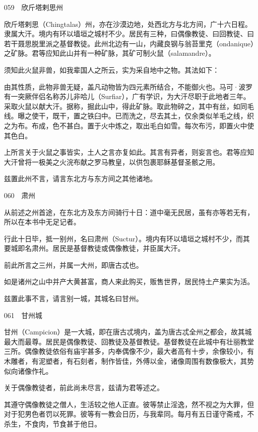 \documentclass[12pt,UTF8]{ctexbook}
\begin{document}
059　欣斤塔剌思州

欣斤塔剌思（Chingtalas）州，亦在沙漠边地，处西北方与北方间，广十六日程。隶属大汗。境内有环以墙垣之城村不少。居民有三种，曰偶像教徒、曰回教徒、曰若干聂思脱里派之基督教徒。此州北边有一山，内藏良钢与翁苔里克（ondanique）之矿脉。君等应知此山并有一种矿脉，其矿可制火鼠（salamandre）。

须知此火鼠非兽，如我辈国人之所云，实为采自地中之物。其法如下：

由其性质，此物非兽无疑，盖凡动物皆为四元素所结合，不能御火也。马可·波罗有一突厥伴侣名称苏儿非哈儿（Surfiar），广有学识，为大汗尽职于此地者三年。采取火鼠以献大汗。据称，掘此山中，得此矿脉。取此物碎之，其中有丝，如同毛线。曝之使干，既干，置之铁臼中。已而洗之，尽去其土，仅余类似羊毛之线，织之为布。布成，色不甚白。置于火中炼之，取出毛白如雪。每次布污，即置火中使其色白。

上所言关于火鼠之事皆实，土人之言亦复如此。其言有异者，则妄言也。君等应知大汗曾将一极美之火浣布献之罗马教皇，以供包裹耶稣基督圣骸之用。

兹置此州不言，请言东北方与东方间之其他诸地。





060　肃州

从前述之州首途，在东北方及东方间骑行十日：道中毫无民居，虽有亦等若无有，所以在本书中无足记者。

行此十日毕，抵一别州，名曰肃州（Suctur）。境内有环以墙垣之城村不少，而其要城即名肃州。居民是基督教徒或偶像教徒，并臣属大汗。

前此所言之三州，并属一大州，即唐古忒也。

如是诸州之山中并产大黄甚富，商人来此购买，贩售世界，居民恃土产果实为活。

兹置此事不言，请言别一城，其城名曰甘州。





061　甘州城

甘州（Campicion）是一大城，即在唐古忒境内，盖为唐古忒全州之都会，故其城最大而最尊。居民是偶像教徒、回教徒及基督教徒。基督教徒在此城中有壮丽教堂三所。偶像教徒依俗有庙宇甚多，内奉偶像不少，最大者高有十步，余像较小，有木雕者，有泥塑者，有石刻者，制作皆佳，外傅以金，诸像周围有数像极大，其势似向诸像作礼。

关于偶像教徒者，前此尚未尽言，兹请为君等述之。

其遵守偶像教徒之僧人，生活较之他人正直。彼等禁止淫逸，然不视之为大罪，但对于犯男色者罚以死罪。彼等有一教会日历，与我辈同。每月有五日谨守斋戒，不杀生，不食肉，节食甚于他日。
\end{document}
